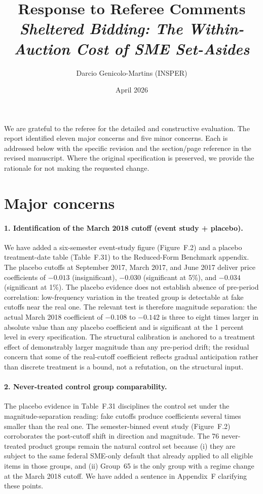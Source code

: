 \documentclass[11pt]{article}
\title{Response to Referee Comments\\
\large \emph{Sheltered Bidding: The Within-Auction Cost of SME Set-Asides}}
\author{Darcio Genicolo-Martins (INSPER)}
\date{April 2026}
\begin{document}
\maketitle

\noindent We are grateful to the referee for the detailed and constructive evaluation. The report identified eleven major concerns and five minor concerns. Each is addressed below with the specific revision and the section/page reference in the revised manuscript. Where the original specification is preserved, we provide the rationale for not making the requested change.

\section*{Major concerns}

\paragraph{1. Identification of the March 2018 cutoff (event study + placebo).}
We have added a six-semester event-study figure (Figure~F.2) and a placebo treatment-date table (Table~F.31) to the Reduced-Form Benchmark appendix. The placebo cutoffs at September 2017, March 2017, and June 2017 deliver price coefficients of $-0.013$ (insignificant), $-0.030$ (significant at 5\%), and $-0.034$ (significant at 1\%). The placebo evidence does not establish absence of pre-period correlation: low-frequency variation in the treated group is detectable at fake cutoffs near the real one. The relevant test is therefore magnitude separation: the actual March 2018 coefficient of $-0.108$ to $-0.142$ is three to eight times larger in absolute value than any placebo coefficient and is significant at the 1 percent level in every specification. The structural calibration is anchored to a treatment effect of demonstrably larger magnitude than any pre-period drift; the residual concern that some of the real-cutoff coefficient reflects gradual anticipation rather than discrete treatment is a bound, not a refutation, on the structural input.

\paragraph{2. Never-treated control group comparability.}
The placebo evidence in Table~F.31 disciplines the control set under the magnitude-separation reading: fake cutoffs produce coefficients several times smaller than the real one. The semester-binned event study (Figure~F.2) corroborates the post-cutoff shift in direction and magnitude. The 76 never-treated product groups remain the natural control set because (i) they are subject to the same federal SME-only default that already applied to all eligible items in those groups, and (ii) Group~65 is the only group with a regime change at the March 2018 cutoff. We have added a sentence in Appendix~F clarifying these points.
\end{document}
